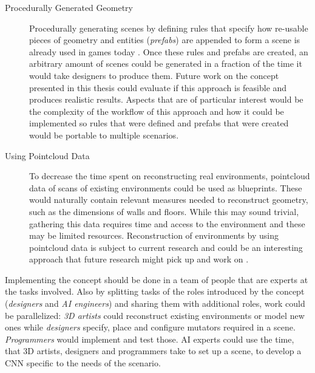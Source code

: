 \begin{description}
    \item [Procedurally Generated Geometry] Procedurally generating scenes by defining rules that specify how re-usable pieces of geometry and entities (\emph{prefabs}) are appended to form a scene is already used in games today \cite{strafeWiki}. Once these rules and prefabs are created, an arbitrary amount of scenes could be generated in a fraction of the time it would take designers to produce them. Future work on the concept presented in this thesis could evaluate if this approach is feasible and produces realistic results. Aspects that are of particular interest would be the complexity of the workflow of this approach and how it could be implemented so rules that were defined and prefabs that were created would be portable to multiple scenarios.
    \item [Using Pointcloud Data] To decrease the time spent on reconstructing real environments, pointcloud data of scans of existing environments could be used as blueprints. These would naturally contain relevant measures needed to reconstruct geometry, such as the dimensions of walls and floors. While this may sound trivial, gathering this data requires time and access to the environment and these may be limited resources. Reconstruction of environments by using pointcloud data is subject to current research and could be an interesting approach that future research might pick up and work on \cite{MINEO201981}. 
\end{description}
Implementing the concept should be done in a team of people that are experts at the tasks involved. Also by splitting tasks of the roles introduced by the concept (\textit{designers} and \textit{\ac{AI} engineers}) and sharing them with additional roles, work could be parallelized: \textit{3D artists} could reconstruct existing environments or model new ones while \textit{designers} specify, place and configure mutators required in a scene. \textit{Programmers} would implement and test those. \ac{AI} experts could use the time, that 3D artists, designers and programmers take to set up a scene, to develop a \ac{CNN} specific to the needs of the scenario.